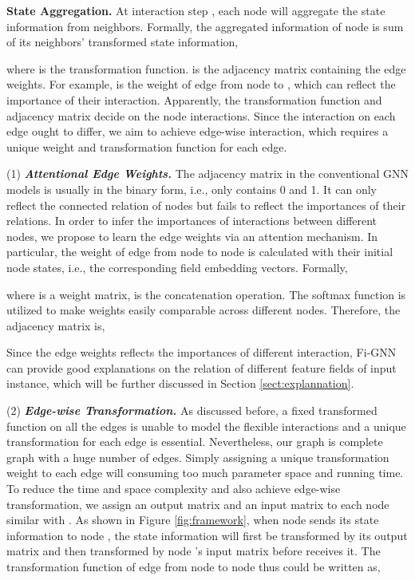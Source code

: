 \documentclass[sigconf]{acmart}
\begin{document}
\noindent \textbf{State Aggregation.}
At interaction step , each node will aggregate the state information from neighbors.
Formally, the aggregated information of node  is sum of its neighbors' transformed state information,

where  is the transformation function.
 is the adjacency matrix containing the edge weights.
For example,  is the weight of edge from node  to , which can reflect the importance of their interaction.
Apparently, the transformation function and adjacency matrix decide on the node interactions.
Since the interaction on each edge ought to differ, we aim to achieve edge-wise interaction, which requires a unique weight and transformation function for each edge.        


(1) \textit{\textbf{Attentional Edge Weights.}}
The adjacency matrix in the conventional GNN models is usually in the binary form, i.e., only contains 0 and 1.
It can only reflect the connected relation of nodes but fails to reflect the importances of their relations.
In order to infer the importances of interactions between different nodes, we propose to learn the edge weights via an attention mechanism.
In particular, the weight of edge from node  to node  is calculated with their initial node states, i.e., the corresponding field embedding vectors.
Formally,

where  is a weight matrix,  is the concatenation operation.
The softmax function is utilized to make weights easily comparable across different nodes.
Therefore, the adjacency matrix is,



Since the edge weights reflects the importances of different interaction, Fi-GNN can provide good explanations on the relation of different feature fields of input instance, which will be further discussed in Section \ref{sect:explannation}.


       


(2) \textit{\textbf{Edge-wise Transformation.}}
As discussed before, a fixed transformed function on all the edges is unable to model the flexible interactions and a unique transformation for each edge is essential. 
Nevertheless, our graph is complete graph with a huge number of edges.
Simply assigning a unique transformation weight to each edge will consuming too much parameter space and running time. 
To reduce the time and space complexity and also achieve edge-wise transformation, we assign an output matrix  and an input matrix  to each node  similar with \cite{cui2019dressing}.
As shown in Figure \ref{fig:framework}, when node  sends its state information to node , the state information will first be transformed by its output matrix  and then transformed by node 's input matrix  before  receives it. 
The transformation function of edge  from node  to node  thus could be written as,
\end{document}

